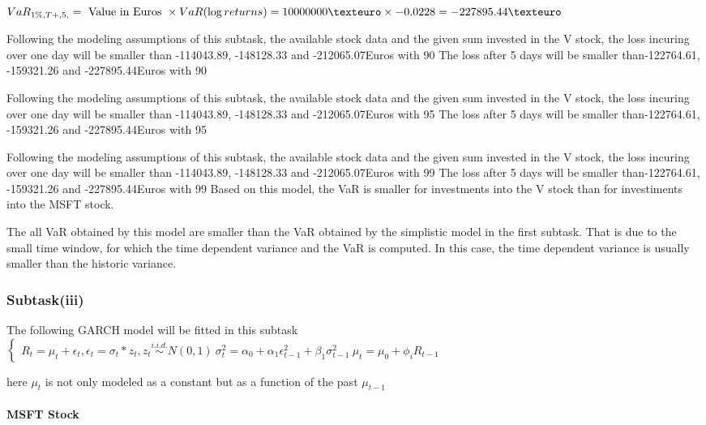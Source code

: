 $VaR_{1\%, T + ,5,} = \text{ Value in Euros } \times VaR(\log returns) = 10 000 000 \texteuro \times-0.0228 = -227895.44 \texteuro$


Following the modeling assumptions of this subtask, the available stock data and the given sum invested in the V stock, the loss incuring over one day will be smaller than -114043.89, -148128.33 and -212065.07Euros with 90%
The loss after 5 days will be smaller than-122764.61, -159321.26 and -227895.44Euros with 90%


Following the modeling assumptions of this subtask, the available stock data and the given sum invested in the V stock, the loss incuring over one day will be smaller than -114043.89, -148128.33 and -212065.07Euros with 95%
The loss after 5 days will be smaller than-122764.61, -159321.26 and -227895.44Euros with 95%


Following the modeling assumptions of this subtask, the available stock data and the given sum invested in the V stock, the loss incuring over one day will be smaller than -114043.89, -148128.33 and -212065.07Euros with 99%
The loss after 5 days will be smaller than-122764.61, -159321.26 and -227895.44Euros with 99%
Based on this model, the VaR is smaller for investments into the V stock than for investiments into the MSFT stock.

The all VaR obtained by this model are smaller than the VaR obtained by the simplistic model in the first subtask. That is due to the small time window, for which the time dependent variance and the VaR is computed. In this case, the time dependent variance is usually smaller than the historic variance.

\subsubsection{Subtask(iii)}
The following GARCH model will be fitted in this subtask
$\begin{cases} R_t = \mu_t + \epsilon_t, \epsilon_t = \sigma_t  * z_t, z_t \overset{i.i.d.}{\sim} N(0,1) \ \sigma^2_t = \alpha_0 + \alpha_1 \epsilon^2_{t-1} + \beta_1 \sigma^2_{t-1} \ \mu_t = \mu_0 + \phi_i R_{t-1} \end{cases}$ 


here $\mu_t$ is not only modeled as a constant but as a function of the past $\mu_{t-1}$
\paragraph{MSFT Stock}


